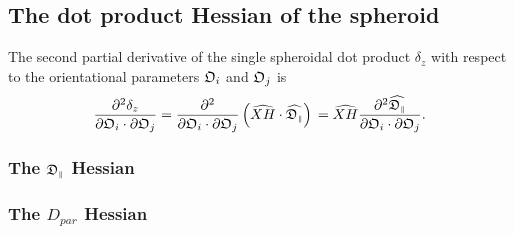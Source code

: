 
\subsection{The dot product Hessian of the spheroid}

The second partial derivative of the single spheroidal dot product $\delta_z$ with respect to the orientational parameters $\mathfrak{O}_i$ and $\mathfrak{O}_j$ is
\begin{equation}
    \frac{\partial^2 \delta_z}{\partial \mathfrak{O}_i \cdot \partial \mathfrak{O}_j}
        = \frac{\partial^2}{\partial \mathfrak{O}_i \cdot \partial \mathfrak{O}_j} \left( \widehat{XH} \cdot \widehat{\mathfrak{D}_{\scriptscriptstyle \parallel}} \right) \\
        = \widehat{XH} \frac{\partial^2 \widehat{\mathfrak{D}_{\scriptscriptstyle \parallel}}}{\partial \mathfrak{O}_i \cdot \partial \mathfrak{O}_j}.
\end{equation}



\begin{latexonly}
    \subsubsection{The $\mathfrak{D}_{\scriptscriptstyle \parallel}$ Hessian}
\end{latexonly}
\begin{htmlonly}
    \subsubsection{The $D_{par}$ Hessian}
\end{htmlonly}

